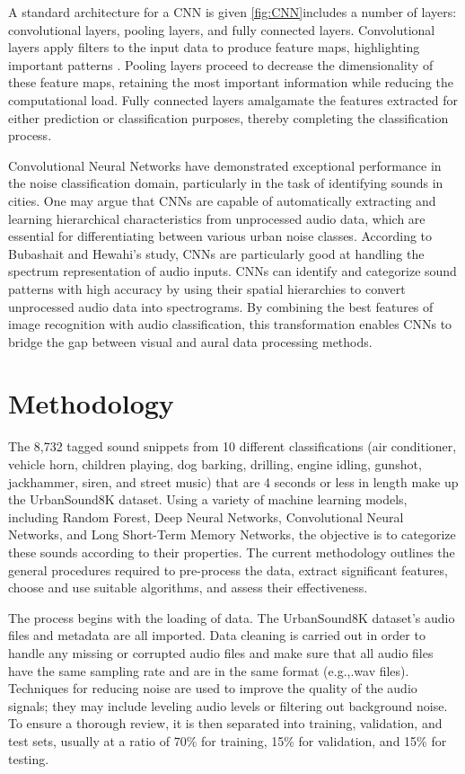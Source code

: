 \documentclass[conference]{IEEEtran}
\begin{document}
A standard architecture  for a CNN is given \ref{fig:CNN}includes a number of layers: convolutional layers, pooling layers, and fully connected layers. Convolutional layers apply filters to the input data to produce feature maps, highlighting important patterns \cite{CNN}. Pooling layers proceed to decrease the dimensionality of these feature maps, retaining the most important information while reducing the computational load. Fully connected layers amalgamate the features extracted for either prediction or classification purposes, thereby completing the classification process.

Convolutional Neural Networks have demonstrated exceptional performance in the noise classification domain, particularly in the task of identifying sounds in cities.\cite{bubashait2021urban}\cite{song2021machine} One may argue that CNNs are capable of automatically extracting and learning hierarchical characteristics from unprocessed audio data, which are essential for differentiating between various urban noise classes. According to Bubashait and Hewahi's study, CNNs are particularly good at handling the spectrum representation of audio inputs. CNNs can identify and categorize sound patterns with high accuracy by using their spatial hierarchies to convert unprocessed audio data into spectrograms. By combining the best features of image recognition with audio classification, this transformation enables CNNs to bridge the gap between visual and aural data processing methods.


\section{Methodology}

The 8,732 tagged sound snippets from 10 different classifications (air conditioner, vehicle horn, children playing, dog barking, drilling, engine idling, gunshot, jackhammer, siren, and street music) that are 4 seconds or less in length make up the UrbanSound8K dataset. Using a variety of machine learning models, including Random Forest, Deep Neural Networks, Convolutional Neural Networks, and Long Short-Term Memory Networks, the objective is to categorize these sounds according to their properties. The current methodology outlines the general procedures required to pre-process the data, extract significant features, choose and use suitable algorithms, and assess their effectiveness.

The process begins with the loading of data. The UrbanSound8K dataset's audio files and metadata are all imported. Data cleaning is carried out in order to handle any missing or corrupted audio files and make sure that all audio files have the same sampling rate and are in the same format (e.g.,.wav files). Techniques for reducing noise are used to improve the quality of the audio signals; they may include leveling audio levels or filtering out background noise. To ensure a thorough review, it is then separated into training, validation, and test sets, usually at a ratio of 70\% for training, 15\% for validation, and 15\% for testing.
\end{document}
